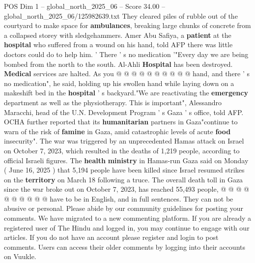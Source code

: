 \begin{textsample}{POS Dim 1 – global\_north\_2025\_06 – Score 34.00 – global\_north\_2025\_06/125982639.txt}
They cleared piles of rubble out of the courtyard to make space for \textbf{ambulances}, breaking large chunks of concrete from a collapsed storey with sledgehammers.
Amer Abu Safiya, a \textbf{patient} at the \textbf{hospital} who suffered from a wound on his hand, told AFP there was little doctors could do to help him. ' There ' s no medication '"Every day we are being bombed from the north to the south.
Al-Ahli \textbf{Hospital} has been destroyed. \textbf{Medical} services are halted.
As you @ @ @ @ @ @ @ @ @ @ hand, and there ' s no medication", he said, holding up his swollen hand while laying down on a makeshift bed in the \textbf{hospital} ' s backyard."We are reactivating the \textbf{emergency} department as well as the physiotherapy.
This is important", Alessandro Maracchi, head of the U.N.
Development Program ' s Gaza ' s office, told AFP.
OCHA further reported that its \textbf{humanitarian} partners in Gaza"continue to warn of the risk of \textbf{famine} in Gaza, amid catastrophic levels of acute \textbf{food} insecurity".
The war was triggered by an unprecedented Hamas attack on Israel on October 7, 2023, which resulted in the deaths of 1,219 people, according to official Israeli figures.
The \textbf{health} \textbf{ministry} in Hamas-run Gaza said on Monday ( June 16, 2025 ) that 5,194 people have been killed since Israel resumed strikes on the \textbf{territory} on March 18 following a truce.
The overall death toll in Gaza since the war broke out on October 7, 2023, has reached 55,493 people, @ @ @ @ @ @ @ @ @ @ have to be in English, and in full sentences.
They can not be abusive or personal.
Please abide by our community guidelines for posting your comments.
We have migrated to a new commenting platform.
If you are already a registered user of The Hindu and logged in, you may continue to engage with our articles.
If you do not have an account please register and login to post comments.
Users can access their older comments by logging into their accounts on Vuukle.

\end{textsample}
